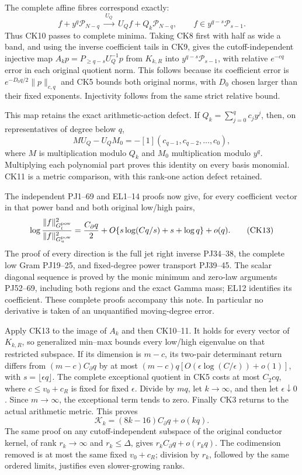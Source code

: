 \documentclass[10pt]{article}
\begin{document}
The complete affine fibres correspond exactly: \[
 f+y^q\mathcal P_{N-q}\ \xrightarrow{\ U_Q\ }\ U_Qf+Q_k\mathcal P_{N-q},
 \qquad f\in y^{q-s}\mathcal P_{s-1}.
 \tag{CK11}
\] Thus CK10 passes to complete minima. Taking CK8 first with half as wide a band, and using the inverse coefficient tails in CK9, gives the cutoff-independent injective map \(A_kp=P_{\ge q-s}U_Q^{-1}p\) from \(K_{k,R}\) into \(y^{q-s}\mathcal P_{s-1}\), with relative \(e^{-cq}\) error in each original quotient norm. This follows because its coefficient error is \(e^{-D_0q/2}\|p\|_{c,q}\) and CK5 bounds both original norms, with \(D_0\) chosen larger than their fixed exponents. Injectivity follows from the same strict relative bound.

This map retains the exact arithmetic-action defect. If \(Q_k=\sum_{j=0}^qc_jy^j\), then, on representatives of degree below \(q\), \[
 M U_Q-U_QM_0=-[1](c_{q-1},c_{q-2},\ldots,c_0),
 \tag{CK12}
\] where \(M\) is multiplication modulo \(Q_k\) and \(M_0\) multiplication modulo \(y^q\). Multiplying each polynomial part proves this identity on every basis monomial. CK11 is a metric comparison, with this rank-one action defect retained.

The independent PJ1--69 and EL1--14 proofs now give, for every coefficient vector in that power band and both original low/high pairs, \[
 \log\frac{\|f\|_{G_l^{\rm pow}}^2}{\|f\|_{G_u^{\rm pow}}^2}
 =\frac{C_\partial q}{2}
 +O\{s\log(Cq/s)+s+\log q\}+o(q).
 \tag{CK13}
\] The proof of every direction is the full jet right inverse PJ34--38, the complete low Gram PJ19--25, and fixed-degree power transport PJ39--45. The scalar diagonal sequence is proved by the monic minimum and zero-law arguments PJ52--69, including both regions and the exact Gamma mass; EL12 identifies its coefficient. These complete proofs accompany this note. In particular no derivative is taken of an unquantified moving-degree error.

Apply CK13 to the image of \(A_k\) and then CK10--11. It holds for every vector of \(K_{k,R}\), so generalized min--max bounds every low/high eigenvalue on that restricted subspace. If its dimension is \(m-c\), its two-pair determinant return differs from \((m-c)C_\partial q\) by at most \((m-c)q[O(\epsilon\log(C/\epsilon))+o(1)]\), with \(s=\lfloor\epsilon q\rfloor\). The complete exceptional quotient in CK5 costs at most \(C_2cq\), where \(c\le v_0+c_R\) is fixed for fixed \(\epsilon\). Divide by \(mq\), let \(k\to\infty\), and then let \(\epsilon\downarrow0\). Since \(m\to\infty\), the exceptional term tends to zero. Finally CK3 returns to the actual arithmetic metric. This proves \[
 \boxed{\mathcal K_k=(8k-16)C_\partial q+o(kq).}
 \tag{CK14}
\] The same proof on any cutoff-independent subspace of the original conductor kernel, of rank \(r_k\to\infty\) and \(r_k\le\Delta\), gives \(r_kC_\partial q+o(r_kq)\). The codimension removed is at most the same fixed \(v_0+c_R\); division by \(r_k\), followed by the same ordered limits, justifies even slower-growing ranks.
\end{document}
